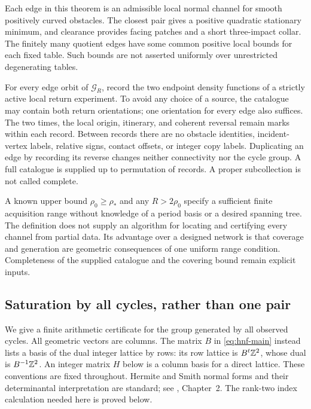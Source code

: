 Each edge in this theorem is an admissible local normal channel for
smooth positively curved obstacles. The closest pair gives a positive
quadratic stationary minimum, and clearance provides facing patches
and a short three-impact collar. The finitely many quotient edges have
some common positive local bounds for each fixed table. Such bounds
are not asserted uniformly over unrestricted degenerating tables.

\begin{definition}\label{def:catalogue}
For every edge orbit of $\mathcal G_R$, record the two endpoint density
functions of a strictly active local return experiment. To avoid any
choice of a source, the catalogue may contain both return orientations;
one orientation for every edge also suffices. The two times, the local
origin, itinerary, and coherent reversal remain marks within each
record. Between records there are no obstacle identities, incident-vertex
labels, relative signs, contact offsets, or integer copy labels.
Duplicating an edge by recording its reverse changes neither connectivity
nor the cycle group. A full catalogue is supplied up to permutation of
records. A proper subcollection is not called complete.
\end{definition}

A known upper bound $\rho_0\ge\rho_*$ and any $R>2\rho_0$ specify
a sufficient finite acquisition range without knowledge of a period
basis or a desired spanning tree. The definition does not supply an
algorithm for locating and certifying every channel from partial data.
Its advantage over a designed network is that coverage and generation
are geometric consequences of one uniform range condition. Completeness
of the supplied catalogue and the covering bound remain explicit inputs.

\subsection{Saturation by all cycles, rather than one pair}
We give a finite arithmetic certificate for the group generated by all
observed cycles. All geometric vectors are columns. The matrix $B$ in
\eqref{eq:hnf-main} instead lists a basis of the dual integer lattice by
rows: its row lattice is $B^t\mathbb Z^2$, whose dual is $B^{-1}\mathbb Z^2$.
An integer matrix $H$ below is a column basis for a direct lattice.
These conventions are fixed throughout. Hermite and Smith normal forms
and their determinantal interpretation are standard; see \cite{Cohen},
Chapter~2. The rank-two index calculation needed here is proved below.

